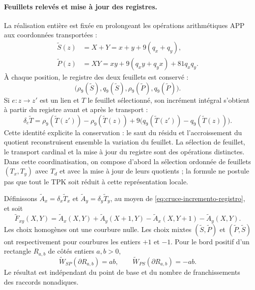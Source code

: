 \paragraph{Feuillets relevés et mise à jour des registres.}
La réalisation entière est fixée en prolongeant les opérations arithmétiques
APP aux coordonnées transportées :
\begin{align*}
 \widetilde S(z)&=X+Y=x+y+9(q_x+q_y),\\
 \widetilde P(z)&=XY
 =xy+9(q_xy+q_yx)+81q_xq_y.
\end{align*}
À chaque position, le registre des deux feuillets est conservé :
\[
 \bigl(\rho_9(\widetilde S),q_9(\widetilde S),
       \rho_9(\widetilde P),q_9(\widetilde P)\bigr).
\]
Si $e:z\to z'$ est un lien et $T$ le feuillet sélectionné, son incrément
intégral s'obtient à partir du registre avant et après le transport :
\begin{equation}
 \delta_e\widetilde T=
 \rho_9(\widetilde T(z'))-\rho_9(\widetilde T(z))
 +9\bigl(q_9(\widetilde T(z'))-q_9(\widetilde T(z))\bigr).
 \label{eq:cruce-incremento-registro}
\end{equation}
Cette identité explicite la conservation : le saut du résidu et
l’accroissement du quotient reconstruisent ensemble la variation du feuillet.
La sélection de feuillet, le transport cardinal et la mise à jour du
registre sont des opérations distinctes. Dans cette coordinatisation, on compose d’abord la
sélection ordonnée de feuillets $(T_x,T_y)$ avec $T_d$ et avec la mise à jour
de leurs quotients ; la formule ne postule pas que tout le TPK soit réduit
à cette représentation locale.

\begin{proposition}
\label{prop:cruce-stokes-integral}
Définissons
$\widetilde A_x=\delta_x\widetilde T_x$ et
$\widetilde A_y=\delta_y\widetilde T_y$, au moyen de
\eqref{eq:cruce-incremento-registro}, et soit
\[
 \widetilde F_{xy}(X,Y)=
 \widetilde A_x(X,Y)+\widetilde A_y(X+1,Y)
 -\widetilde A_x(X,Y+1)-\widetilde A_y(X,Y).
\]
Les choix homogènes ont une courbure nulle. Les choix mixtes
$(\widetilde S,\widetilde P)$ et
$(\widetilde P,\widetilde S)$ ont respectivement pour courbures les entiers
$+1$ et $-1$. Pour le bord positif d'un rectangle
$R_{a,b}$ de côtés entiers $a,b>0$,
\[
 \widetilde W_{SP}(\partial R_{a,b})=ab,\qquad
 \widetilde W_{PS}(\partial R_{a,b})=-ab.
\]
Le résultat est indépendant du point de base et du nombre de franchissements
des raccords nonadiques.
\end{proposition}

